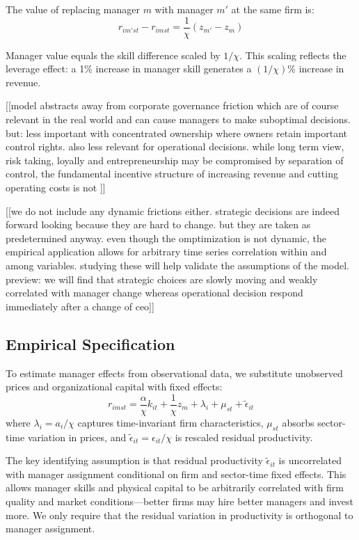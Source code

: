 \documentclass[11pt,a4paper]{article}
\begin{document}
The value of replacing manager $m$ with manager $m'$ at the same firm is:
\begin{equation}\label{eq:manager_value}
r_{im'st} - r_{imst} = \frac{1}{\chi}(z_{m'} - z_{m})
\end{equation}

Manager value equals the skill difference scaled by $1/\chi$. This scaling reflects the leverage effect: a 1\% increase in manager skill generates a $(1/\chi)\%$ increase in revenue.

[[model abstracts away from corporate governance friction which are of course relevant in the real world and can cause managers to make suboptimal decisions. but: less important with concentrated ownership where owners retain important control rights. also less relevant for operational decisions. while long term view, risk taking, loyally and entrepreneurship may be compromised by separation of control, the fundamental incentive structure of increasing revenue and cutting operating costs is not ]]


[[we do not include any dynamic frictions either. strategic decisions are indeed forward looking because they are hard to change. but they are taken as predetermined anyway. even though the omptimization is not dynamic, the empirical application allows for arbitrary time series correlation within and among variables. studying these will help validate the assumptions of the model. preview: we will find that strategic choices are slowly moving and weakly correlated with manager change whereas operational decision respond immediately after a change of ceo]]

\subsection{Empirical Specification}

To estimate manager effects from observational data, we substitute unobserved prices and organizational capital with fixed effects:
\begin{equation}\label{eq:empirical}
r_{imst} = \frac{\alpha}{\chi} k_{it} + \frac{1}{\chi}z_m + \lambda_i + \mu_{st} + \tilde{\epsilon}_{it}
\end{equation}
where $\lambda_i = a_i/\chi$ captures time-invariant firm characteristics, $\mu_{st}$ absorbs sector-time variation in prices, and $\tilde{\epsilon}_{it} = \epsilon_{it}/\chi$ is rescaled residual productivity.

The key identifying assumption is that residual productivity $\tilde{\epsilon}_{it}$ is uncorrelated with manager assignment conditional on firm and sector-time fixed effects. This allows manager skills and physical capital to be arbitrarily correlated with firm quality and market conditions—better firms may hire better managers and invest more. We only require that the residual variation in productivity is orthogonal to manager assignment.
\end{document}
